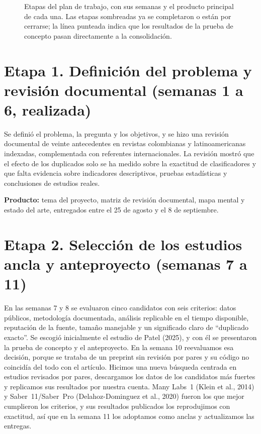 \documentclass[11pt,openany,oneside,letterpaper]{book}
\newcommand{\seccioncorta}[2]{{\renewcommand{\sectionmark}[1]{}\section{#2}}\markright{\MakeUppercase{\thesection.\ #1}}}
\begin{document}
\begin{figure}[H]
\caption{Etapas del plan de trabajo, con sus semanas y el producto principal de cada una. Las etapas sombreadas ya se completaron o están por cerrarse; la línea punteada indica que los resultados de la prueba de concepto pasan directamente a la consolidación.}
\label{fig:etapas}
\end{figure}

\seccioncorta{Etapa 1}{Etapa 1. Definición del problema y revisión documental (semanas 1 a 6, realizada)}

Se definió el problema, la pregunta y los objetivos, y se hizo una revisión documental de veinte antecedentes en revistas colombianas y latinoamericanas indexadas, complementada con referentes internacionales. La revisión mostró que el efecto de los duplicados solo se ha medido sobre la exactitud de clasificadores y que falta evidencia sobre indicadores descriptivos, pruebas estadísticas y conclusiones de estudios reales.

\textbf{Producto:} tema del proyecto, matriz de revisión documental, mapa mental y estado del arte, entregados entre el 25 de agosto y el 8 de septiembre.

\seccioncorta{Etapa 2}{Etapa 2. Selección de los estudios ancla y anteproyecto (semanas 7 a 11)}

En las semanas 7 y 8 se evaluaron cinco candidatos con seis criterios: datos públicos, metodología documentada, análisis replicable en el tiempo disponible, reputación de la fuente, tamaño manejable y un significado claro de ``duplicado exacto''. Se escogió inicialmente el estudio de Patel (2025), y con él se presentaron la prueba de concepto y el anteproyecto. En la semana 10 reevaluamos esa decisión, porque se trataba de un preprint sin revisión por pares y su código no coincidía del todo con el artículo. Hicimos una nueva búsqueda centrada en estudios revisados por pares, descargamos los datos de los candidatos más fuertes y replicamos sus resultados por nuestra cuenta. Many Labs~1 (Klein et al., 2014) y Saber~11/Saber~Pro (Delahoz-Dominguez et al., 2020) fueron los que mejor cumplieron los criterios, y sus resultados publicados los reprodujimos con exactitud, así que en la semana 11 los adoptamos como anclas y actualizamos las entregas.
\end{document}
